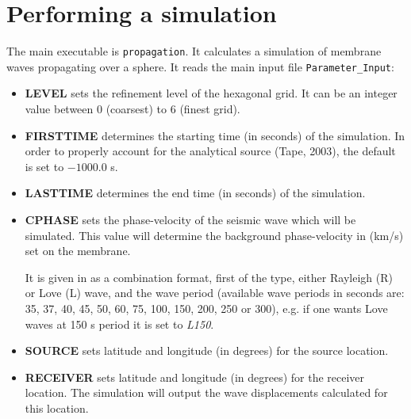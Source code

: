 \documentclass[a4paper,
                          headsepline,
                          listof=totoc,
                          toc=listof,
                          headings=small]{scrreprt} %
\begin{document}
\chapter{Performing a simulation}
The main executable is \texttt{propagation}.
It calculates a simulation of membrane waves propagating over a sphere.
It reads the main input file \texttt{Parameter\_Input}:
\\
\begin{itemize}


\item{\textbf{LEVEL}}
sets the refinement level of the hexagonal grid. It can be an integer value
between $0$ (coarsest) to $6$ (finest grid).

\item \textbf{FIRSTTIME}
determines the starting time (in seconds) of the simulation. In order to properly account for the analytical source (Tape, 2003), the default is set to $-1000.0$ s.

\item \textbf{LASTTIME}
determines the end time (in seconds) of the simulation.

\item \textbf{CPHASE}
sets the phase-velocity of the seismic wave which will be simulated. This value
will determine the background phase-velocity in (km/s) set on the membrane.

It is given in as a combination format, first of the type, either Rayleigh (R) or Love (L) wave, and the wave period (available wave periods in seconds are: 35, 37, 40, 45, 50, 60, 75, 100, 150, 200, 250 or 300), e.g. if one wants Love waves at 150 s period it is set to \textit{L150}.


\item \textbf{SOURCE}
sets latitude and longitude (in degrees) for the source location.

\item \textbf{RECEIVER}
sets latitude and longitude (in degrees) for the receiver location.
The simulation will output the wave displacements calculated for this location.



\end{itemize}
\end{document}
